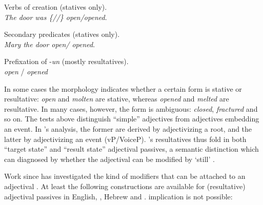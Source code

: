 \begin{exe}
\begin{xlist}
\begin{exe}
\begin{xlist}
\begin{exe}
\begin{exe}
\begin{xlist}
\begin{exe}
\begin{exe}
\begin{xlist}
\begin{exe}
\begin{xlist}
\begin{exe}
\begin{xlist}
\begin{exe}
\begin{xlist}
\begin{xlist}
\begin{exe}
\begin{xlist}
\ex  Verbs of creation (statives only). \\
	\emph{The door was \{//\} \cmark open/\xmark opened}.

\ex  Secondary predicates (statives only). \\
	\emph{Mary  the door \cmark open/ \xmark opened}.

\ex  Prefixation of -\emph{un} (mostly resultatives). \\
	\xmark \emph{open} / \cmark \emph{opened}
 \z 

In some cases the morphology indicates whether a certain form is stative or resultative: \emph{open} and \emph{molten} are stative, whereas \emph{opened} and \emph{melted} are resultative. In many cases, however, the form is ambiguous: \emph{closed}, \emph{fractured} and so on. The tests above distinguish ``simple'' adjectives from adjectives embedding an event. In \citeauthor{embick04li}'s analysis, the former are derived by adjectivizing a root, and the latter by adjectivizing an event (vP/VoiceP). \citeauthor{embick04li}'s resultatives thus fold in both ``target state'' and ``result state'' adjectival passives, a semantic distinction which can diagnosed by whether the adjectival  can be modified by `still' \citep{kratzer00bls,alexiadouetal14}.

Work since has investigated the kind of modifiers that can be attached to an adjectival  \citep{meltzerasscher11,mcintyre13,alexiadouetal14,bruening14nllt,gehrkemarco14}. At least the following constructions are available for (resultative) adjectival passives in English, , Hebrew and .  implication is not possible:
 \begin{exe}
 \ex  
 \begin{xlist} 
 \z
\z 


\end{xlist}
\end{exe}
\end{xlist}
\end{exe}
\end{xlist}
\end{xlist}
\end{exe}
\end{xlist}
\end{exe}
\end{xlist}
\end{exe}
\end{xlist}
\end{exe}
\end{exe}
\end{xlist}
\end{exe}
\end{exe}
\end{xlist}
\end{exe}
\end{xlist}
\end{exe}
